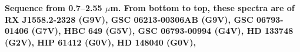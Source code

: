 {\bf Sequence from 0.7–2.55 $\mu$m. From bottom to top, these spectra are of RX J1558.2-2328 (G9V), GSC 06213-00306AB (G9V), GSC 06793-01406 (G7V), HBC 649 (G5V), GSC 06793-00994 (G4V), HD 133748 (G2V), HIP 61412 (G0V), HD 148040 (G0V), 
\label{fig:stack-plot-g}}
